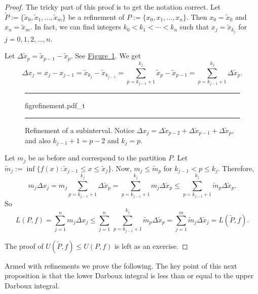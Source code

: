 \documentclass[12pt]{book}
\newenvironment{myfigureht}{%
\begin{figure}[h!t]
\noindent\rule{\textwidth}{0.4pt}\vspace{12pt}\par\centering}%
{\par\noindent\rule{\textwidth}{0.4pt}
\end{figure}}
\theoremstyle{plain}
\theoremstyle{remark}
\theoremstyle{definition}
\theoremstyle{exercise}
\theoremstyle{example}
\newcommand{\figureref}[1]{\hyperref[#1]{Figure~\ref*{#1}}}
\begin{document}
\begin{proof}
The tricky part of this proof is to get the notation correct.
Let $\widetilde{P} := \{ \widetilde{x}_0, \widetilde{x}_1, \ldots,
\widetilde{x}_m \}$ be
a refinement of 
$P := \{ x_0, x_1, \ldots, x_n \}$.  Then
$x_0 = \widetilde{x}_0$ and 
$x_n = \widetilde{x}_m$.  In fact, we can find integers
$k_0 < k_1 < \cdots < k_n$ such that $x_j = \widetilde{x}_{k_j}$ for
$j=0,1,2,\ldots,n$.

Let $\Delta \widetilde{x}_p = \widetilde{x}_{p-1} - \widetilde{x}_p$.
See \figureref{fig:refinement}.
We get 
\begin{equation*}
\Delta x_j
=
x_j - x_{j-1} =
\widetilde{x}_{k_j} - \widetilde{x}_{k_{j-1}} =
\sum_{p=k_{j-1}+1}^{k_j} 
\widetilde{x}_{p} - \widetilde{x}_{p-1}
=
\sum_{p=k_{j-1}+1}^{k_j} \Delta \widetilde{x}_p .
\end{equation*}
\begin{myfigureht}
{figrefinement.pdf_t}
\caption{Refinement of a subinterval.  Notice $\Delta x_j =
\Delta \widetilde{x}_{p-2} +
\Delta \widetilde{x}_{p-1} +
\Delta \widetilde{x}_{p}$,
and also
$k_{j-1}+1 = p-2$ and
$k_{j} = p$.\label{fig:refinement}}
\end{myfigureht}

Let $m_j$ be as before and correspond to the partition $P$.
Let $\widetilde{m}_j := \inf \{ f(x) : \widetilde{x}_{j-1} \leq x \leq
\widetilde{x}_j \}$.
Now, $m_j \leq \widetilde{m}_p$ for $k_{j-1} < p \leq k_j$.  Therefore,
\begin{equation*}
m_j \Delta x_j
=
m_j \sum_{p=k_{j-1}+1}^{k_j} \Delta \widetilde{x}_p
=
\sum_{p=k_{j-1}+1}^{k_j} m_j \Delta \widetilde{x}_p
\leq
\sum_{p=k_{j-1}+1}^{k_j} \widetilde{m}_p \Delta \widetilde{x}_p .
\end{equation*}
So
\begin{equation*}
L(P,f) =
\sum_{j=1}^n m_j \Delta x_j
\leq
\sum_{j=1}^n \,
\sum_{p=k_{j-1}+1}^{k_j} \widetilde{m}_p \Delta \widetilde{x}_p
=
\sum_{j=1}^m
\widetilde{m}_j \Delta \widetilde{x}_j = L(\widetilde{P},f).
\end{equation*}

The proof of $U(\widetilde{P},f) \leq U(P,f)$ is left as an exercise.
\end{proof}

Armed with refinements we prove the following.
The key point of this next proposition is that
the lower Darboux integral is less than or equal to the upper Darboux
integral.
\end{document}
